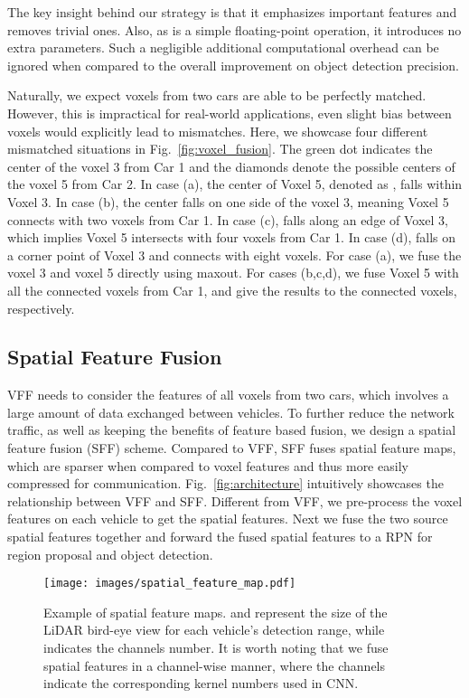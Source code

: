 \documentclass[sigconf]{acmart}
\begin{document}
The key insight behind our  strategy is that it emphasizes important features and removes trivial ones. 
Also, as   is a simple floating-point operation, it introduces no extra parameters. Such a negligible additional computational overhead can be ignored when compared to the overall improvement on object detection precision. 





Naturally, we expect voxels from two cars are able to be perfectly matched. However, this is impractical for real-world applications, even slight bias between voxels would explicitly lead to mismatches. 
Here, we showcase four different mismatched situations in Fig.~\ref{fig:voxel_fusion}.
The green dot  indicates the center of the voxel 3 from Car 1 and the diamonds  denote the possible centers of the voxel 5 from Car 2.
In case (a), the center of Voxel 5, denoted as , falls within Voxel 3. 
In case (b), the center  falls on one side of the voxel 3, meaning Voxel 5 connects with two voxels from Car 1. 
In case (c),  falls along an edge of Voxel 3, which implies Voxel 5 intersects with four voxels from Car 1.
In case (d),  falls on a corner point of Voxel 3 and connects with eight voxels. 
For case (a), we fuse the voxel 3 and voxel 5 directly using maxout. 
For cases (b,c,d), we fuse Voxel 5 with all the connected voxels from Car 1, and give the results to the connected voxels, respectively.






\subsection{\textbf{Spatial Feature Fusion}}
VFF needs to consider the features of all voxels from two  cars, which involves a large amount of data exchanged between vehicles.
To further reduce the network traffic, as well as keeping the benefits of feature based fusion, we design a spatial feature fusion (SFF) scheme.
Compared to VFF, SFF fuses spatial feature maps, which are sparser when compared to voxel features and thus more easily compressed for communication.
Fig.~\ref{fig:architecture} intuitively showcases the relationship between VFF and SFF.
Different from VFF, we pre-process the voxel features on each vehicle to get the spatial features. Next we fuse the two source spatial features together and forward the fused spatial features to a RPN for region proposal and object detection.

\begin{figure}[h]
    \centering
    \texttt{[image: images/spatial\_feature\_map.pdf]}
    \vspace{-7pt}
    \caption{Example of spatial feature maps.  and  represent the size of the LiDAR bird-eye view for each vehicle's detection range, while  indicates the channels number. It is worth noting that we fuse spatial features in a channel-wise manner, where the channels indicate the corresponding kernel numbers used in CNN.}
    \vspace{-11pt}
    \label{fig:3d_feature_maps}
\end{figure}
\end{document}
